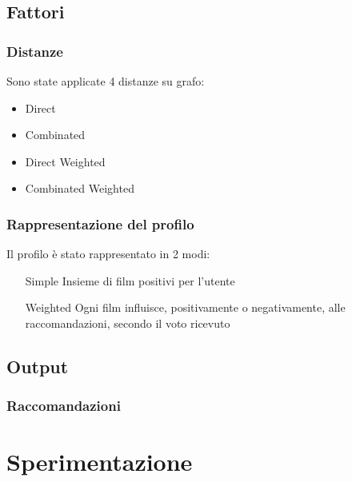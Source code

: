 \documentclass{beamer}
\begin{document}

\subsection{Fattori}


\begin{frame}
\frametitle{Distanze}
Sono state applicate 4 distanze su grafo:

\begin{itemize}
\item Direct
\item Combinated
\item Direct Weighted
\item Combinated Weighted
\end{itemize}
\end{frame}


\begin{frame}
\frametitle{Rappresentazione del profilo}
Il profilo è stato rappresentato in 2 modi:

\begin{itemize}
\item[Simple] Insieme di film positivi per l'utente
\item[Weighted] Ogni film influisce, positivamente o negativamente, alle raccomandazioni, secondo il voto ricevuto
\end{itemize}


\end{frame}


\subsection{Output}


\begin{frame}
\frametitle{Raccomandazioni}
\end{frame}


\section{Sperimentazione}
\end{document}
